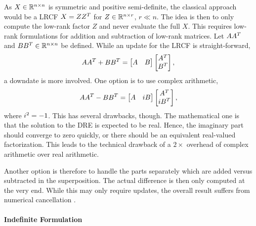 As $X\in\mathbb{R}^{n\times n}$ is symmetric and positive semi-definite,
the classical approach would be a \ac{LRCF} $X=ZZ^T$
for $Z \in\mathbb{R}^{n\times r}$, $r\ll n$.
The idea is then to only compute the low-rank factor $Z$
and never evaluate the full $X$.
This requires low-rank formulations for addition and subtraction of low-rank matrices.
Let $AA^T$ and $BB^T \in\mathbb{R}^{n\times n}$ be defined.
While an update for the \ac{LRCF} is straight-forward,
\begin{equation}
  AA^T + BB^T =
  \begin{bmatrix}
    A & B
  \end{bmatrix}
  \begin{bmatrix}
    A^T \\ B^T
  \end{bmatrix}
  ,
\end{equation}
a downdate is more involved.
One option is to use complex arithmetic, \ie
\begin{equation}
  AA^T - BB^T =
  \begin{bmatrix}
    A & i B
  \end{bmatrix}
  \begin{bmatrix}
    A^T \\ i B^T
  \end{bmatrix}
  ,
\end{equation}
where $i^2=-1$.
This has several drawbacks, though.
The mathematical one is that the solution to the \ac{DRE} is expected to be real.
Hence, the imaginary part should converge to zero quickly,
or there should be an equivalent real-valued factorization.
This leads to the technical drawback of a $2\times$ overhead of complex arithmetic over real arithmetic.

Another option is therefore to handle the parts separately which are added versus subtracted in the superposition.
The actual difference is then only computed at the very end.
While this may only require updates,
the overall result suffers from numerical cancellation
\cite[50]{Lang2015}
\cite[\pno~186, thesis~10]{Lang2017}.

\pagebreak

\paragraph{Indefinite Formulation}

